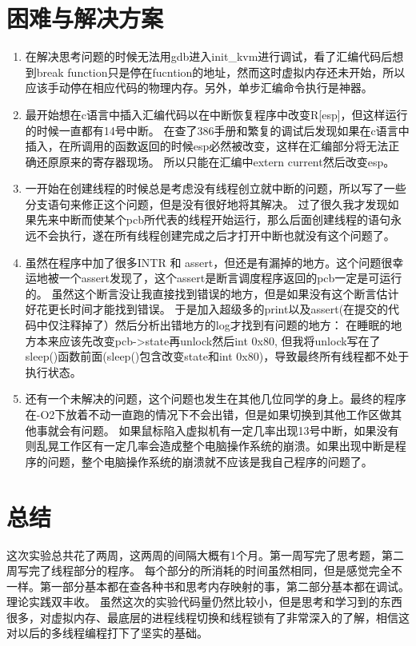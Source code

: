 \documentclass[11pt]{article}
\begin{document}
\section{困难与解决方案}
\begin{enumerate}
  \item
    在解决思考问题的时候无法用gdb进入init\_kvm进行调试，看了汇编代码后想到break function只是停在fucntion的地址，然而这时虚拟内存还未开始，所以应该手动停在相应代码的物理内存。另外，单步汇编命令执行是神器。
  \item
    最开始想在c语言中插入汇编代码以在中断恢复程序中改变R[esp]，但这样运行的时候一直都有14号中断。
    在查了386手册和繁复的调试后发现如果在c语言中插入，在所调用的函数返回的时候esp必然被改变，这样在汇编部分将无法正确还原原来的寄存器现场。
    所以只能在汇编中extern current然后改变esp。
  \item
    一开始在创建线程的时候总是考虑没有线程创立就中断的问题，所以写了一些分支语句来修正这个问题，但是没有很好地将其解决。
    过了很久我才发现如果先来中断而使某个pcb所代表的线程开始运行，那么后面创建线程的语句永远不会执行，遂在所有线程创建完成之后才打开中断也就没有这个问题了。
  \item
    虽然在程序中加了很多INTR 和 assert，但还是有漏掉的地方。这个问题很幸运地被一个assert发现了，这个assert是断言调度程序返回的pcb一定是可运行的。
    虽然这个断言没让我直接找到错误的地方，但是如果没有这个断言估计好花更长时间才能找到错误。
    于是加入超级多的print以及assert(在提交的代码中仅注释掉了）然后分析出错地方的log才找到有问题的地方：
    在睡眠的地方本来应该先改变pcb->state再unlock然后int 0x80, 但我将unlock写在了sleep()函数前面(sleep()包含改变state和int 0x80)，导致最终所有线程都不处于执行状态。
  \item
    还有一个未解决的问题，这个问题也发生在其他几位同学的身上。最终的程序在-O2下放着不动一直跑的情况下不会出错，但是如果切换到其他工作区做其他事就会有问题。
    如果鼠标陷入虚拟机有一定几率出现13号中断，如果没有则乱晃工作区有一定几率会造成整个电脑操作系统的崩溃。如果出现中断是程序的问题，整个电脑操作系统的崩溃就不应该是我自己程序的问题了。
 \end{enumerate}

    
\section{总结}
    这次实验总共花了两周，这两周的间隔大概有1个月。第一周写完了思考题，第二周写完了线程部分的程序。
    每个部分的所消耗的时间虽然相同，但是感觉完全不一样。第一部分基本都在查各种书和思考内存映射的事，第二部分基本都在调试。理论实践双丰收。
    虽然这次的实验代码量仍然比较小，但是思考和学习到的东西很多，对虚拟内存、最底层的进程线程切换和线程锁有了非常深入的了解，相信这对以后的多线程编程打下了坚实的基础。
    
\end{document}
